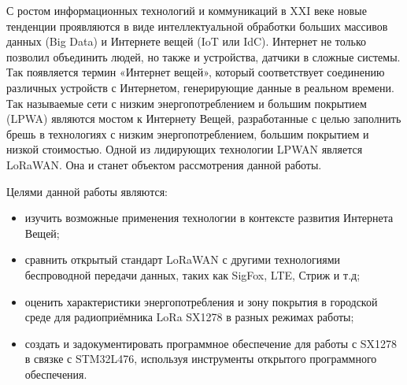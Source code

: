 \Introduction

С ростом информационных технологий и коммуникаций в XXI веке новые тенденции проявляются в виде интеллектуальной обработки больших массивов данных (Big Data) и Интернете вещей (IoT или IdC). 
Интернет не только позволил объединить людей, но также и устройства, датчики в сложные системы. 
Так появляется термин «Интернет вещей», который соответствует соединению различных устройств с Интернетом, генерирующие данные в реальном времени. 
Так называемые сети с низким энергопотреблением и большим покрытием (LPWA) являются мостом к Интернету Вещей, разработанные с целью заполнить брешь в технологиях с низким энергопотреблением, большим покрытием и низкой стоимостью. 
Одной из лидирующих технологии LPWAN является LoRaWAN. Она и станет объектом рассмотрения данной работы.

Целями данной работы являются:


\begin{itemize}
	\item изучить возможные применения технологии в контексте развития Интернета Вещей;
	\item сравнить открытый стандарт LoRaWAN с другими технологиями беспроводной передачи данных, таких как SigFox, LTE, Стриж и т.д;
	\item оценить характеристики энергопотребления и зону покрытия в городской среде для радиоприёмника LoRa SX1278 в разных режимах работы;
	\item создать и задокументировать программное обеспечение для работы с SX1278 в связке с STM32L476, используя инструменты открытого программного обеспечения.
\end{itemize}

